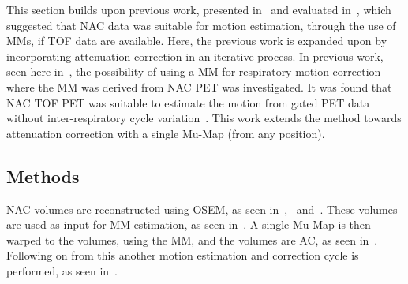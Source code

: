             This section builds upon previous work, presented in~ and evaluated in~, which suggested that \gls{NAC} data was suitable for motion estimation, through the use of \glspl{MM}, if \gls{TOF} data are available. Here, the previous work is expanded upon by incorporating attenuation correction in an iterative process. In previous work, seen here in~, the possibility of using a \gls{MM} for respiratory motion correction where the \gls{MM} was derived from \gls{NAC} \gls{PET} was investigated. It was found that \gls{NAC} \gls{TOF} \gls{PET} was suitable to estimate the motion from gated \gls{PET} data without inter-respiratory cycle variation~\parencite{Whitehead2019ImpactPET}. This work extends the method towards attenuation correction with a single \gls{Mu-Map} (from any position).
        
        \subsection{Methods} \label{sec:pet_ct_respiratory_motion_correction_with_a_single_attenuation_map_using_nac_derived_deformation_fields_methods}
            \gls{NAC} volumes are reconstructed using \gls{OSEM}, as seen in~,~ and~. These volumes are used as input for \gls{MM} estimation, as seen in~. A single \gls{Mu-Map} is then warped to the volumes, using the \gls{MM}, and the volumes are \gls{AC}, as seen in~. Following on from this another motion estimation and correction cycle is performed, as seen in~.
            
